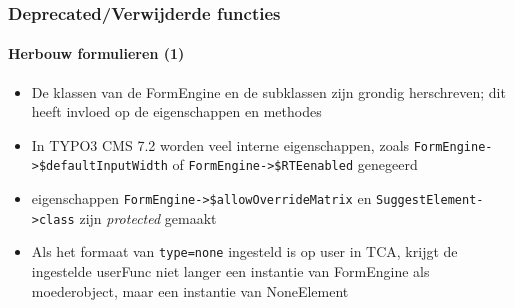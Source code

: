 \begin{frame}[fragile]
	\frametitle{Deprecated/Verwijderde functies}
	\framesubtitle{Herbouw formulieren (1)}

	\begin{itemize}

		\item De klassen van de FormEngine en de subklassen zijn grondig herschreven; dit
		 	heeft invloed op de eigenschappen en methodes

		\item In TYPO3 CMS 7.2 worden veel interne eigenschappen, zoals
			\small\texttt{FormEngine->\$defaultInputWidth}\normalsize\space
			of
			\small\texttt{FormEngine->\$RTEenabled}\normalsize\space\newline
			genegeerd

		\item eigenschappen
			\small\texttt{FormEngine->\$allowOverrideMatrix}\normalsize\space
			en
			\small\texttt{SuggestElement->class}\normalsize\space
			zijn \textit{protected} gemaakt

		\item Als het formaat van \texttt{type=none} ingesteld is op user in TCA, krijgt de ingestelde
			userFunc niet langer een instantie van FormEngine als moederobject,
			maar een instantie van NoneElement

	\end{itemize}

\end{frame}


